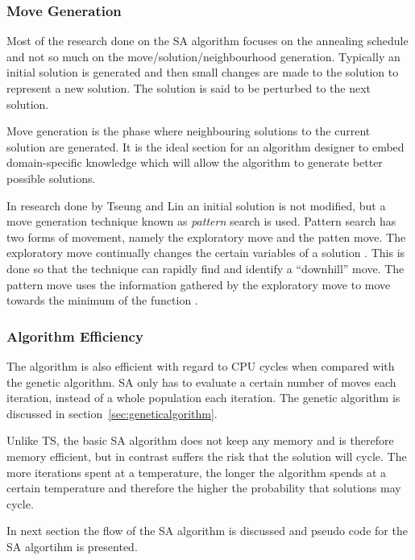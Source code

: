 \subsubsection{Move Generation}
Most of the research done on the SA algorithm focuses on the annealing schedule and not so much on the move/solution/neighbourhood generation. Typically an initial solution is generated and then small changes are made to the solution to represent a new solution. The solution is said to be perturbed to the next solution.

Move generation is the phase where neighbouring solutions to the current solution are generated. It is the ideal section for an algorithm designer to embed domain-specific knowledge which will allow the algorithm to generate better possible solutions.

In research done by Tseung and Lin \cite{CurveFittingSA} an initial solution is not modified, but a move generation technique known as \emph{pattern} search is used. Pattern search has two forms of movement, namely the exploratory move and the patten move. The exploratory move continually changes the certain variables of a solution \cite{CurveFittingSA}. This is done so that the technique can rapidly find and identify a ``downhill'' move. The pattern move uses the information gathered by the exploratory move to move towards the minimum of the function \cite{CurveFittingSA}.
\subsubsection{Algorithm Efficiency}
The algorithm is also efficient with regard to CPU cycles when compared with the genetic algorithm. SA only has to evaluate a certain number of moves each iteration, instead of a whole population each iteration. The genetic algorithm is discussed in section~\ref{sec:geneticalgorithm}.

Unlike TS, the basic SA algorithm does not keep any memory and is therefore memory efficient, but in contrast suffers the risk that the solution will cycle. The more iterations spent at a temperature, the longer the algorithm spends at a certain temperature and therefore the higher the probability that solutions may cycle.

In next section the flow of the SA algorithm is discussed and pseudo code for the SA algortihm is presented.

